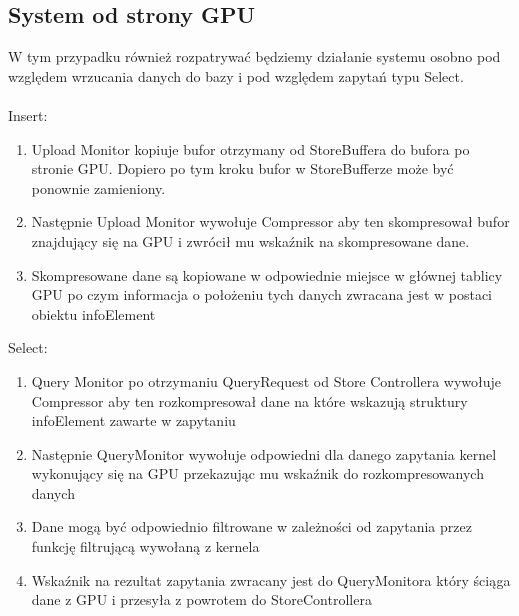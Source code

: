 \documentclass[paper=a4, fontsize=11pt]{scrartcl} %
\numberwithin{equation}{section} %
\numberwithin{figure}{section} %
\numberwithin{table}{section} %
\begin{document}
	\subsection{System od strony GPU}
		W tym przypadku również rozpatrywać będziemy działanie systemu osobno pod względem wrzucania danych do bazy i pod względem zapytań typu Select. \\ \\
		Insert: \\
		\begin{enumerate}
			\item Upload Monitor kopiuje bufor otrzymany od StoreBuffera do bufora po stronie GPU. Dopiero po tym kroku bufor w StoreBufferze może być ponownie zamieniony.
			\item Następnie Upload Monitor wywołuje Compressor aby ten skompresował bufor znajdujący się na GPU i zwrócił mu wskaźnik na skompresowane dane.
			\item Skompresowane dane są kopiowane w odpowiednie miejsce w głównej tablicy GPU po czym informacja o położeniu tych danych zwracana jest w postaci 
				obiektu infoElement
		\end{enumerate}
		Select: \\
		\begin{enumerate}
			\item Query Monitor po otrzymaniu QueryRequest od Store Controllera wywołuje Compressor aby ten rozkompresował dane na które wskazują struktury infoElement zawarte w zapytaniu
			\item Następnie QueryMonitor wywołuje odpowiedni dla danego zapytania kernel wykonujący się na GPU przekazując mu wskaźnik do rozkompresowanych danych 
			\item Dane mogą być odpowiednio filtrowane w zależności od zapytania przez funkcję filtrującą wywołaną z kernela
			\item Wskaźnik na rezultat zapytania zwracany jest do QueryMonitora który ściąga dane z GPU i przesyła z powrotem do StoreControllera
		\end{enumerate}
\end{document}
